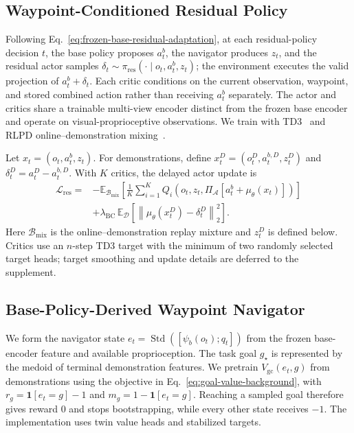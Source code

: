 \documentclass[letterpaper]{article} %
\begin{document}
\subsection{Waypoint-Conditioned Residual Policy}
\label{sec:hier}
Following Eq.~\eqref{eq:frozen-base-residual-adaptation}, at each residual-policy
decision $t$, the base policy proposes $a_t^b$, the navigator produces
$z_t$, and the residual actor samples
$\delta_t\sim\pi_{\mathrm{res}}(\cdot\mid o_t,a_t^b,z_t)$; the
environment executes the valid projection of $a_t^b+\delta_t$. Each critic
conditions on the current observation, waypoint, and stored combined action
rather than receiving $a_t^b$ separately. The actor and critics share a
trainable multi-view encoder distinct from the frozen base encoder and operate
on visual-proprioceptive observations. We train with
TD3~\cite{fujimoto2018addressing} and RLPD online--demonstration
mixing~\cite{ball2023efficient}.

Let $x_t=(o_t,a_t^b,z_t)$. For demonstrations, define
$x_t^D=(o_t^D,a_t^{b,D},z_t^D)$ and
$\delta_t^D=a_t^D-a_t^{b,D}$. With $K$ critics, the delayed actor update is
\begin{equation}
\begin{aligned}
\mathcal L_{\mathrm{res}}
={}&-\mathbb E_{\mathcal B_{\mathrm{mix}}}\!\left[
 \frac{1}{K}\sum_{i=1}^{K}
 Q_i\!\left(o_t,z_t,
 \Pi_{\mathcal A}[a_t^b+\mu_\theta(x_t)]\right)\right]\\
&+\lambda_{\mathrm{BC}}\,
\mathbb E_{\mathcal D}\!\left[
\left\|\mu_\theta(x_t^D)-\delta_t^D\right\|_2^2\right].
\end{aligned}
\label{eq:residual-actor-objective}
\end{equation}
Here $\mathcal B_{\mathrm{mix}}$ is the online--demonstration replay mixture
and $z_t^D$ is defined below. Critics use an $n$-step TD3 target with the
minimum of two randomly selected target heads; target smoothing and update
details are deferred to the supplement.

\subsection{Base-Policy-Derived Waypoint Navigator}
\label{sec:value}
We form the navigator state
$e_t=\operatorname{Std}([\psi_b(o_t);q_t])$ from the frozen
base-encoder feature and available proprioception. The task goal $g_\star$ is
represented by the medoid of terminal
demonstration features. We pretrain $V_{\mathrm{gc}}(e_t,g)$ from
demonstrations using the objective in
Eq.~\eqref{eq:goal-value-background}, with
$r_g=\mathbf 1[e_t=g]-1$ and $m_g=1-\mathbf 1[e_t=g]$. Reaching a sampled
goal therefore gives reward $0$ and stops bootstrapping, while every other
state receives $-1$. The implementation uses twin value heads and stabilized targets.
\end{document}
